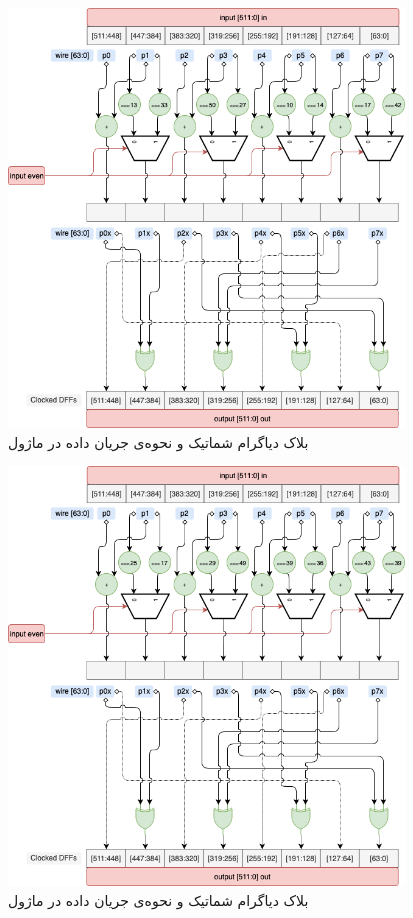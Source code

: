 \begin{figure}[H]
	\centering
	\includegraphics[width=10.5cm]{images/diagrams_round2.png}	
	\caption{
		بلاک دیاگرام شماتیک و نحوه‌ی جریان داده در ماژول 
	}
\end{figure}
\begin{figure}[H]
	\centering
	\includegraphics[width=10.5cm]{images/diagrams_round3.png}	
	\caption{
		بلاک دیاگرام شماتیک و نحوه‌ی جریان داده در ماژول 
	}
\end{figure}
